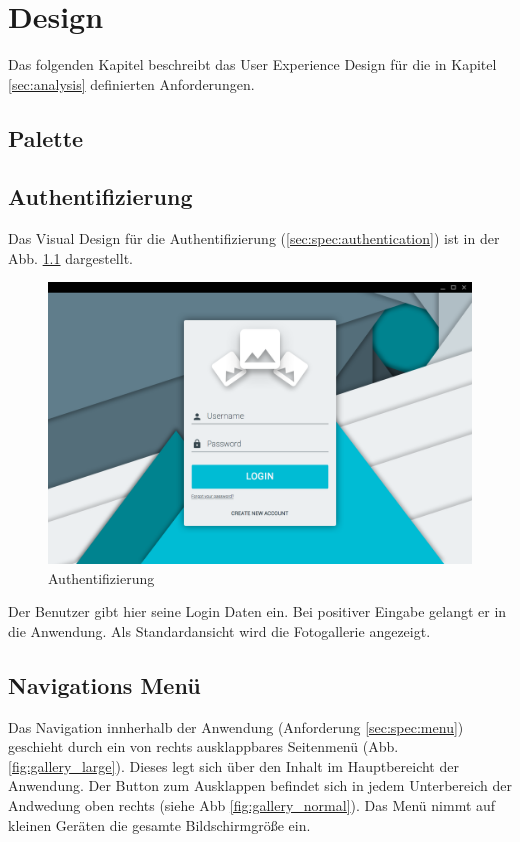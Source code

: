 \chapter{Design}

Das folgenden Kapitel beschreibt das User Experience Design für die in Kapitel \ref{sec:analysis} definierten Anforderungen.

\section{Palette}

\section{Authentifizierung}

Das Visual Design für die Authentifizierung (\ref{sec:spec:authentication}) ist in der Abb. \ref{fig:login_form} dargestellt.

\begin{figure}[htp]     %
\centering
\includegraphics[width=1.0\textwidth]{images/login_form} 
\caption{Authentifizierung}\label{fig:login_form}
\end{figure}

Der Benutzer gibt hier seine Login Daten ein. Bei positiver Eingabe gelangt er in die Anwendung. Als Standardansicht wird die Fotogallerie angezeigt.

\section{Navigations Menü}

Das Navigation innherhalb der Anwendung (Anforderung \ref{sec:spec:menu}) geschieht durch ein von rechts ausklappbares Seitenmenü (Abb. \ref{fig:gallery_large}). Dieses legt sich über den Inhalt im Hauptbereicht der Anwendung. Der Button zum Ausklappen befindet sich in jedem Unterbereich der Andwedung oben rechts (siehe Abb \ref{fig:gallery_normal}). Das Menü nimmt auf kleinen Geräten die gesamte Bildschirmgröße ein.

